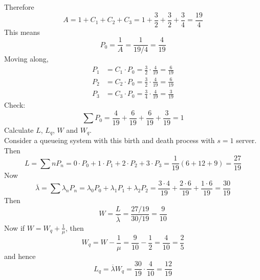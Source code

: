 \documentclass[12pt]{article}
\begin{document}
Therefore $$A = 1 + C_1 + C_2 + C_3 = 1 + \frac{3}{2} + \frac{3}{2} + \frac{3}{4} = \frac{19}{4}$$ This means $$P_0 = \frac{1}{A} = \frac{1}{19/4} = \frac{4}{19} $$ 
Moving along, $$ \begin{aligned} P_1 &= C_1 \cdot P_0 = \frac{3}{2} \cdot \frac{4}{19} = \frac{6}{19} \\ P_2 &= C_2 \cdot P_0 = \frac{3}{2} \cdot \frac{4}{19} = \frac{6}{19} \\ P_3 &= C_3 \cdot P_0 = \frac{3}{4} \cdot \frac{4}{19} = \frac{3}{19} \end{aligned} $$ 
Check: $$\sum P_0 = \frac{4}{19} + \frac{6}{19} + \frac{6}{19} + \frac{3}{19} = 1 $$ 
Calculate $L$, $L_q$, $W$ and $W_q$. \\ 
Consider a queueing system with this birth and death process with $s=1$ server. Then 
$$L = \sum nP_n = 0\cdot P_0 + 1 \cdot P_1 + 2 \cdot P_2 + 3 \cdot P_3 = \frac{1}{19}(6 + 12 + 9) = \frac{27}{19} $$ 
Now $$\overline{\lambda} = \sum \lambda_nP_n = \lambda_0P_0 + \lambda_1P_1 + \lambda_2P_2 = \frac{3 \cdot 4}{19} + \frac{2 \cdot 6}{19} + \frac{1 \cdot 6}{19} = \frac{30}{19} $$ 
Then $$ W = \frac{L}{\overline{\lambda}} = \frac{27/19}{30/19} = \frac{9}{10} $$ 
Now if $W = W_q + \frac{1}{\mu}$, then 
$$W_q = W - \frac{1}{\mu} = \frac{9}{10} - \frac{1}{2} = \frac{4}{10} = \frac{2}{5} $$ 
and hence $$L_q = \overline{\lambda}W_q = \frac{30}{19} \cdot \frac{4}{10} = \frac{12}{19} $$ 
\end{document}
